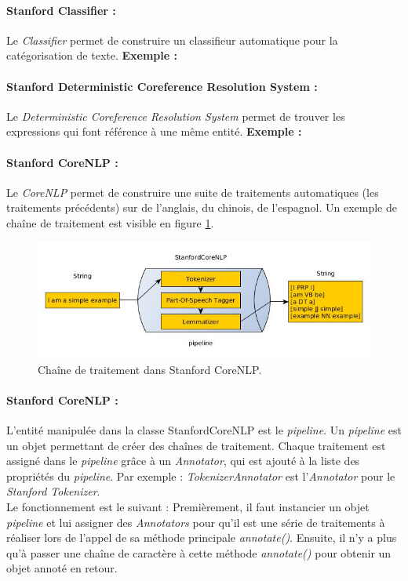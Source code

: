             \paragraph{Stanford Classifier :}
                Le \textit{Classifier} permet de construire un classifieur automatique pour la catégorisation de texte.
                \textbf{Exemple :}

            \paragraph{Stanford Deterministic Coreference Resolution System :}
                Le \textit{Deterministic Coreference Resolution System} permet de trouver les expressions qui font référence à une même entité.
                \textbf{Exemple :}

            \paragraph{Stanford CoreNLP :}
                Le \textit{CoreNLP} permet de construire une suite de traitements automatiques (les traitements précédents) sur de l'anglais, du chinois, de l'espagnol. Un exemple de chaîne de traitement est visible en figure \ref{fig:coreNLP}.

            \begin{figure}[h!]
                \centering
                \includegraphics[width=\textwidth]{images/coreNLP.jpg}
                \caption{Chaîne de traitement dans Stanford CoreNLP.}
                \label{fig:coreNLP}
            \end{figure}

            \paragraph{Stanford CoreNLP :}
                L'entité manipulée dans la classe StanfordCoreNLP est le \textit{pipeline}.
                Un \textit{pipeline} est un objet permettant de créer des chaînes de traitement.
                Chaque traitement est assigné dans le \textit{pipeline} grâce à un \textit{Annotator}, qui est ajouté à la liste des propriétés du \textit{pipeline}. Par exemple : \textit{TokenizerAnnotator} est l'\textit{Annotator} pour le \textit{Stanford Tokenizer}.\\
                Le fonctionnement est le suivant : Premièrement, il faut instancier un objet \textit{pipeline} et lui assigner des \textit{Annotators} pour qu'il est une série de traitements à réaliser lors de l'appel de sa méthode principale \textit{annotate()}. Ensuite, il n'y a plus qu'à passer une chaîne de caractère à cette méthode \textit{annotate()} pour obtenir un objet annoté en retour.\\

